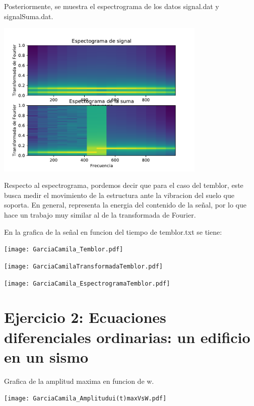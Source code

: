 \documentclass[11pt,letterpaper]{exam}
\begin{document}
Posteriormente, se muestra el espectrograma de los datos signal.dat y signalSuma.dat.

\begin{center}
\includegraphics[width=10cm]{GarciaCamila_Espectrogramas.pdf}
\end{center}

Respecto al espectrograma, pordemos decir que para el caso del temblor, este busca medir el movimiento de la estructura ante la vibracion del suelo que soporta. En general, representa la energia del contenido de la señal, por lo que hace un trabajo muy similar al de la transformada de Fourier. 

En la grafica de la señal en funcion del tiempo de temblor.txt se tiene:

\begin{center}
\texttt{[image: GarciaCamila\_Temblor.pdf]}
\end{center}

\begin{center}
\texttt{[image: GarciaCamilaTransformadaTemblor.pdf]}
\end{center}

\begin{center}
\texttt{[image: GarciaCamila\_EspectrogramaTemblor.pdf]}
\end{center}

\noindent
\section{Ejercicio 2: Ecuaciones diferenciales ordinarias: un edificio en un sismo}

Grafica de la amplitud maxima en funcion de w. 
\begin{center}
\texttt{[image: GarciaCamila\_Amplitudui(t)maxVsW.pdf]}
\end{center}
\end{document}
